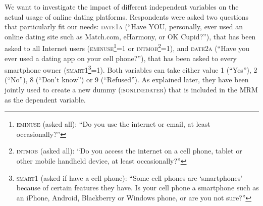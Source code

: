 We want to investigate the impact of different independent variables
on the actual usage of online dating platforms. Respondents were asked
two questions that particularly fit our needs: \textsc{date1a} (\textquotedblleft Have
YOU, personally, ever used an online dating site such as Match.com,
eHarmony, or OK Cupid?\textquotedblright ), that has been asked to
all Internet users (\textsc{eminuse}\footnote{\textsc{eminuse} (asked all): \textquotedblleft Do you use the internet
or email, at least occasionally?\textquotedblright{} }=1 or \textsc{intmob}\footnote{\textsc{intmob} (asked all): \textquotedblleft Do you access the internet
on a cell phone, tablet or other mobile handheld device, at least
occasionally?\textquotedblright{}}=1), and \textsc{date2a} (\textquotedblleft Have you ever used a dating
app on your cell phone?\textquotedblright ), that has been asked to
every smartphone owner (\textsc{smart1}\footnote{\textsc{smart1} (asked if have a cell phone): \textquotedblleft Some
cell phones are \textquoteleft smartphones\textquoteright{} because
of certain features they have. Is your cell phone a smartphone such
as an iPhone, Android, Blackberry or Windows phone, or are you not
sure?\textquotedblright{}}=1). Both variables can take either value 1 (\textquotedblleft Yes\textquotedblright ),
2 (\textquotedblleft No\textquotedblright ), 8 (\textquotedblleft Don't
know\textquotedblright ) or 9 (\textquotedblleft Refused\textquotedblright ).
As explained later, they have been jointly used to create a new dummy
(\textsc{isonlinedater}) that is included in the MRM as the dependent
variable. 


